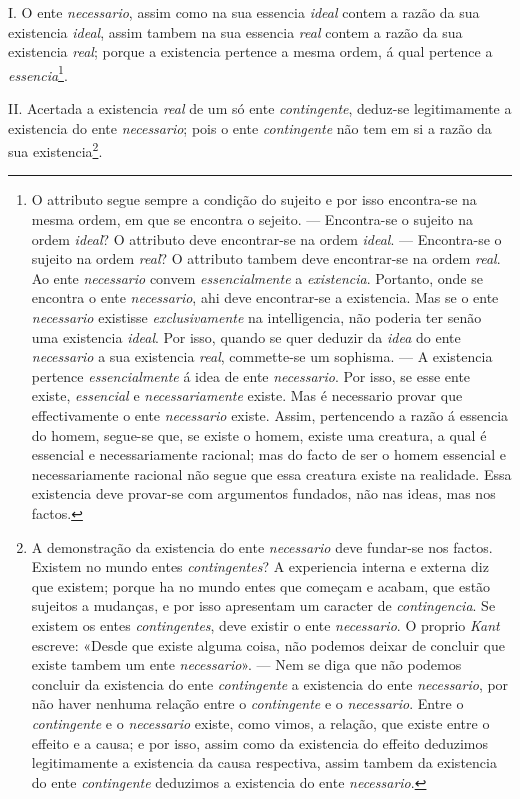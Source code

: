 I. O ente \emph{necessario}, assim como na sua essencia \emph{ideal} contem a razão da sua existencia \emph{ideal}, assim tambem na sua essencia \emph{real} contem a razão da sua existencia \emph{real}; porque a existencia pertence a mesma ordem, á qual pertence a \emph{essencia}\footnote{O attributo segue sempre a condição do sujeito e por isso encontra-se na mesma ordem, em que se encontra o sejeito. --- Encontra-se o sujeito na ordem \emph{ideal}? O attributo deve encontrar-se na ordem \emph{ideal}. --- Encontra-se o sujeito na ordem \emph{real}? O attributo tambem deve encontrar-se na ordem \emph{real}. Ao ente \emph{necessario} convem \emph{essencialmente} a \emph{existencia}. Portanto, onde se encontra o ente \emph{necessario}, ahi deve encontrar-se a existencia. Mas se o ente \emph{necessario} existisse \emph{exclusivamente} na intelligencia, não poderia ter senão uma existencia \emph{ideal}. Por isso, quando se quer deduzir da \emph{idea} do ente \emph{necessario} a sua existencia \emph{real}, commette-se um sophisma. --- A existencia pertence \emph{essencialmente} á idea de ente \emph{necessario}. Por isso, se esse ente existe, \emph{essencial} e \emph{necessariamente} existe. Mas é necessario provar que effectivamente o ente \emph{necessario} existe. Assim, pertencendo a razão á essencia do homem, segue-se que, se existe o homem, existe uma creatura, a qual é essencial e necessariamente racional; mas do facto de ser o homem essencial e necessariamente racional não segue que essa creatura existe na realidade. Essa existencia deve provar-se com argumentos fundados, não nas ideas, mas nos factos.}.

II. Acertada a existencia \emph{real} de um só ente \emph{contingente}, deduz-se legitimamente a existencia do ente \emph{necessario}; pois o ente \emph{contingente} não tem em si a razão da sua existencia\footnote{A demonstração da existencia do ente \emph{necessario} deve fundar-se nos factos. Existem no mundo entes \emph{contingentes}? A experiencia interna e externa diz que existem; porque ha no mundo entes que começam e acabam, que estão sujeitos a mudanças, e por isso apresentam um caracter de \emph{contingencia}. Se existem os entes \emph{contingentes}, deve existir o ente \emph{necessario}. O proprio \emph{Kant} escreve: «Desde que existe alguma coisa, não podemos deixar de concluir que existe tambem um ente \emph{necessario}». --- Nem se diga que não podemos concluir da existencia do ente \emph{contingente} a existencia do ente \emph{necessario}, por não haver nenhuma relação entre o \emph{contingente} e o \emph{necessario}. Entre o \emph{contingente} e o \emph{necessario} existe, como vimos, a relação, que existe entre o effeito e a causa; e por isso, assim como da existencia do effeito deduzimos legitimamente a existencia da causa respectiva, assim tambem da existencia do ente \emph{contingente} deduzimos a existencia do ente \emph{necessario}.}.


